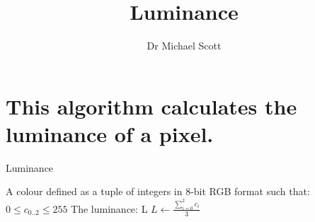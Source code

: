 \documentclass{../../../fal_assignment}
\title{Luminance}
\author{Dr Michael Scott}
\begin{document}
\maketitle

	\section{This algorithm calculates the luminance of a pixel.}
\begin{algorithm}[ht]
	\caption{Luminance}
	\label{alg:algorithm}
	
	\begin{algorithmic}[1]
		\Require 
		\Statex A colour defined as a tuple of integers in 8-bit RGB format such that:
		\Statex $0 \leq c_{0..2} \leq 255$
		\Ensure
		\Statex The luminance:
		\Statex L
		\Statex
		\Statex $ L \leftarrow \frac{\sum_{i=0}^{2}c_i}{3}$
	\end{algorithmic}
	
\end{algorithm}
\end{document}
